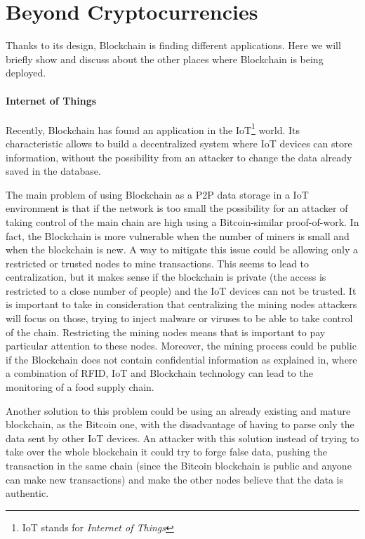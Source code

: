 \section{Beyond Cryptocurrencies}
\label{sec:beyond_crypto}

Thanks to its design, Blockchain is finding different applications. Here
we will briefly show and discuss about the other places where Blockchain
is being deployed.

\paragraph*{Internet of Things}

Recently, Blockchain has found an application in the IoT\footnote{IoT stands
for \textit{Internet of Things}} world\cite{politecnico16}. Its characteristic
allows to build a decentralized system where IoT devices can store information,
without the possibility from an attacker to change the data already saved in
the database\cite{politecnico16}.

The main problem of using Blockchain as a P2P data storage in a IoT environment
is that if the network is too small the possibility for an attacker of taking
control of the main chain are high using a Bitcoin-similar proof-of-work. In
fact, the Blockchain is more vulnerable when the number of miners is small and
when the blockchain is new. A way to mitigate this issue could be allowing only
a restricted or trusted nodes to mine transactions. This seems to lead to
centralization, but it makes sense if the blockchain is private (the access is
restricted to a close number of people) and the IoT devices can not be trusted.
It is important to take in consideration that centralizing the mining nodes
attackers will focus on those, trying to inject malware or viruses to be able to
take control of the chain. Restricting the mining nodes means that is important
to pay particular attention to these nodes.
Moreover, the mining process could be public if the Blockchain does not contain
confidential information as explained in\cite{tian17}, where a combination of
RFID, IoT and Blockchain technology can lead to the monitoring of a food supply
chain.

Another solution to this problem could be using an already existing and mature
blockchain, as the Bitcoin one, with the disadvantage of having to parse only
the data sent by other IoT devices. An attacker with this solution instead of
trying to take over the whole blockchain it could try to forge false data,
pushing the transaction in the same chain (since the Bitcoin blockchain is
public and anyone can make new transactions) and make the other nodes believe
that the data is authentic.

